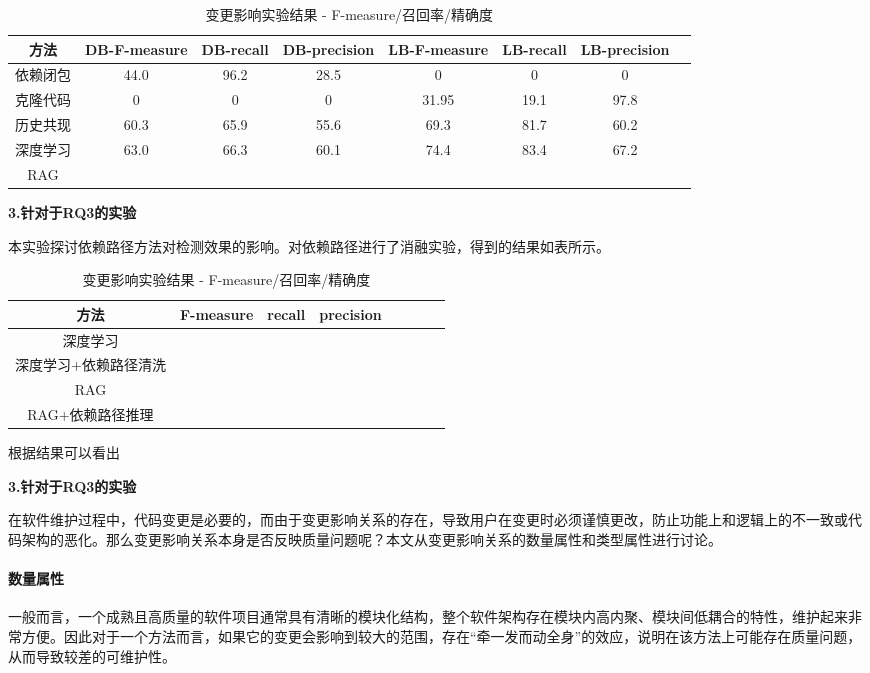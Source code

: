 \begin{table}[htbp]
\caption{变更影响实验结果 - F-measure/召回率/精确度}
\vspace{0.5em}\centering\wuhao
\begin{tabular}{cccccccc}
\toprule
方法 & DB-F-measure & DB-recall & DB-precision & LB-F-measure & LB-recall & LB-precision  \\
\midrule
依赖闭包 & 44.0 & 96.2 & 28.5 & 0 & 0 & 0 \\
克隆代码 & 0 & 0 &  0 & 31.95 & 19.1 & 97.8 \\
历史共现 & 60.3 & 65.9 & 55.6 & 69.3 & 81.7 & 60.2 \\
深度学习 & 63.0 & 66.3 & 60.1 & 74.4 & 83.4 & 67.2 \\
RAG &  &  &  &  &  &  \\
\bottomrule
\end{tabular}
\end{table}

\textbf{3.针对于RQ3的实验}

本实验探讨依赖路径方法对检测效果的影响。对依赖路径进行了消融实验，得到的结果如表所示。



\begin{table}[htbp]
\caption{变更影响实验结果 - F-measure/召回率/精确度}
\vspace{0.5em}\centering\wuhao
\begin{tabular}{cccccccc}
\toprule
方法 & F-measure & recall & precision  \\
\midrule
深度学习 &  &  &  \\
深度学习+依赖路径清洗 &  &  &  \\
RAG &  &  &  \\
RAG+依赖路径推理 &  &  &  \\
\bottomrule
\end{tabular}
\end{table}

根据结果可以看出


\textbf{3.针对于RQ3的实验}



在软件维护过程中，代码变更是必要的，而由于变更影响关系的存在，导致用户在变更时必须谨慎更改，防止功能上和逻辑上的不一致或代码架构的恶化。那么变更影响关系本身是否反映质量问题呢？本文从变更影响关系的数量属性和类型属性进行讨论。

\paragraph{数量属性} 一般而言，一个成熟且高质量的软件项目通常具有清晰的模块化结构，整个软件架构存在模块内高内聚、模块间低耦合的特性，维护起来非常方便。因此对于一个方法而言，如果它的变更会影响到较大的范围，存在“牵一发而动全身”的效应，说明在该方法上可能存在质量问题，从而导致较差的可维护性。

